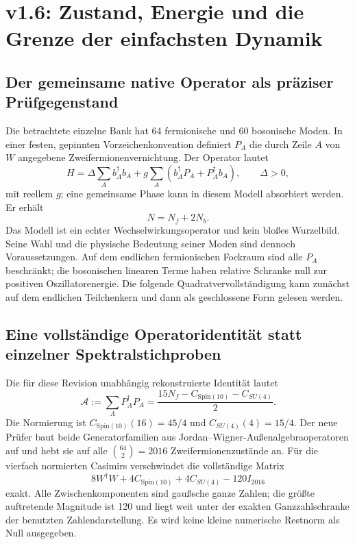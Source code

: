 \chapter{v1.6: Zustand, Energie und die Grenze der einfachsten Dynamik}
\label{ch:v16-state}
\section{Der gemeinsame native Operator als präziser Prüfgegenstand}
Die betrachtete einzelne Bank hat 64 fermionische und 60 bosonische Moden. In einer festen, gepinnten Vorzeichenkonvention definiert $P_A$ die durch Zeile $A$ von $W$ angegebene Zweifermionenvernichtung. Der Operator lautet
\begin{equation}
H=\Delta\sum_A b_A^\dagger b_A
+g\sum_A(b_A^\dagger P_A+P_A^\dagger b_A),\qquad \Delta>0,
\label{eq:v16-H}
\end{equation}
mit reellem $g$; eine gemeinsame Phase kann in diesem Modell absorbiert werden. Er erhält
\begin{equation}
N=N_f+2N_b.
\end{equation}
Das Modell ist ein echter Wechselwirkungsoperator und kein bloßes Wurzelbild. Seine Wahl und die physische Bedeutung seiner Moden sind dennoch Voraussetzungen. Auf dem endlichen fermionischen Fockraum sind alle $P_A$ beschränkt; die bosonischen linearen Terme haben relative Schranke null zur positiven Oszillatorenergie. Die folgende Quadratvervollständigung kann zunächst auf dem endlichen Teilchenkern und dann als geschlossene Form gelesen werden.

\section{Eine vollständige Operatoridentität statt einzelner Spektralstichproben}
Die für diese Revision unabhängig rekonstruierte Identität lautet
\begin{equation}
\boxed{\mathcal A:=\sum_A P_A^\dagger P_A
=\frac{15N_f-C_{\mathrm{Spin}(10)}-C_{SU(4)}}2.}
\label{eq:v16-casimir}
\end{equation}
Die Normierung ist $C_{\mathrm{Spin}(10)}(16)=45/4$ und $C_{SU(4)}(4)=15/4$. Der neue Prüfer baut beide Generatorfamilien aus Jordan--Wigner-Außenalgebraoperatoren auf und hebt sie auf alle $\binom{64}{2}=2016$ Zweifermionenzustände an. Für die vierfach normierten Casimirs verschwindet die vollständige Matrix
\begin{equation}
8W^\dagger W+4C_{\mathrm{Spin}(10)}+4C_{SU(4)}-120I_{2016}
\end{equation}
exakt. Alle Zwischenkomponenten sind gaußsche ganze Zahlen; die größte auftretende Magnitude ist 120 und liegt weit unter der exakten Ganzzahlschranke der benutzten Zahlendarstellung. Es wird keine kleine numerische Restnorm als Null ausgegeben.

